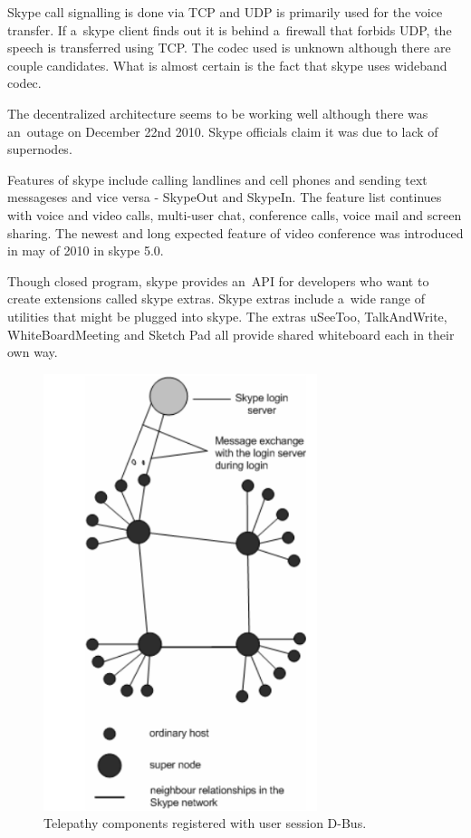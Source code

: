 Skype call signalling is done via TCP and UDP is primarily used for the voice transfer. If a~skype client finds out it is behind a~firewall that forbids UDP, the speech is transferred using TCP. The codec used is unknown although there are couple candidates. What is almost certain is the fact that skype uses wideband codec. 

The decentralized architecture seems to be working well although there was an~outage on December 22nd 2010. Skype officials claim it was due to lack of supernodes\cite{skypeOutage}.  


Features of skype include calling landlines and cell phones and sending text messageses and vice versa - SkypeOut and SkypeIn. The feature list continues with voice and video calls, multi-user chat, conference calls, voice mail and screen sharing. The newest and long expected feature of video conference was introduced in may of 2010 in skype 5.0. 

Though closed program, skype provides an~API for developers who want to create extensions called skype extras. Skype extras include a~wide range of utilities that might be plugged into skype. The extras uSeeToo, TalkAndWrite, WhiteBoardMeeting and Sketch Pad all provide shared whiteboard each in their own way.    


\begin{figure}[ht]
	\begin{center}
	\includegraphics[width=8cm]{fig/skype-architecture.png}
	\caption{Telepathy components registered with user session D-Bus.\cite{skypeProtocolAnalysis}}
	\label{fig:skypeArchitecture}
\end{center}
\end{figure}

